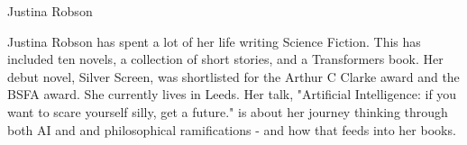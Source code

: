 {\Large Justina Robson}

\begin{figure}
	\vspace{-10mm}
	\vspace{-10mm}
\end{figure}

Justina Robson has spent a lot of her life writing Science Fiction. This has included ten novels, a collection of short stories, and a Transformers book. Her debut novel, Silver Screen, was shortlisted for the Arthur C Clarke award and the BSFA award. She currently lives in Leeds. Her talk, "Artificial Intelligence: if you want to scare yourself silly, get a future." is about her journey thinking through both AI and and philosophical ramifications - and how that feeds into her books.